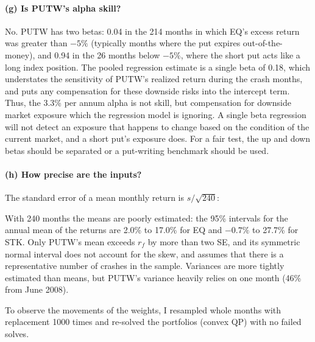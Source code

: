 \documentclass[11pt]{article}
\newcommand{\tbl}[1]{}
\begin{document}
\paragraph{(g) Is PUTW's alpha skill?} No. PUTW has two betas: 0.04 in the 214 months in which EQ's excess return was greater than $-5\%$ (typically months where the put expires out-of-the-money), and 0.94 in the 26 months below $-5\%$, where the short put acts like a long index position. The pooled regression estimate is a single beta of 0.18, which understates the sensitivity of PUTW's realized return during the crash months, and puts any compensation for these downside risks into the intercept term. Thus, the 3.3\% per annum alpha is not skill, but compensation for downside market exposure which the regression model is ignoring. A single beta regression will not detect an exposure that happens to change based on the condition of the current market, and a short put's exposure does. For a fair test, the up and down betas should be separated or a put-writing benchmark should be used.

\paragraph{(h) How precise are the inputs?} The standard error of a mean monthly return is $s/\sqrt{240}$:

\begin{table}[H]
\centering\small
\caption{Standard error of each mean monthly return and the 95\% interval for the annual mean.}
\tbl{p4_precision}
\end{table}

With 240 months the means are poorly estimated: the 95\% intervals for the annual mean of the returns are 2.0\% to 17.0\% for EQ and $-0.7\%$ to 27.7\% for STK. Only PUTW's mean exceeds $r_f$ by more than two SE, and its symmetric normal interval does not account for the skew, and assumes that there is a representative number of crashes in the sample. Variances are more tightly estimated than means, but PUTW's variance heavily relies on one month (46\% from June 2008).

To observe the movements of the weights, I resampled whole months with replacement 1000 times and re-solved the portfolios (convex QP) with no failed solves.

\begin{table}[H]
\centering\small
\caption{Bootstrap distribution of the tangency weights (1,000 resamples).}
\tbl{p4_bootstrap}
\end{table}
\end{document}

